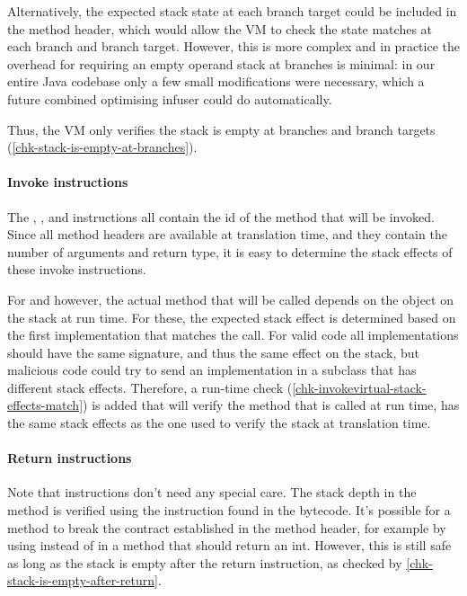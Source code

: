 Alternatively, the expected stack state at each branch target could be included in the method header, which would allow the VM to check the state matches at each branch and branch target. However, this is more complex and in practice the overhead for requiring an empty operand stack at branches is minimal: in our entire Java codebase only a few small modifications were necessary, which a future combined optimising infuser could do automatically.

Thus, the VM only verifies the stack is empty at branches and branch targets (\ref{chk-stack-is-empty-at-branches}).

\paragraph{Invoke instructions}
The , , and  instructions all contain the id of the method that will be invoked. Since all method headers are available at translation time, and they contain the number of arguments and return type, it is easy to determine the stack effects of these invoke instructions.
 
For  and  however, the actual method that will be called depends on the object on the stack at run time. For these, the expected stack effect is determined based on the first implementation that matches the call. For valid code all implementations should have the same signature, and thus the same effect on the stack, but malicious code could try to send an implementation in a subclass that has different stack effects. Therefore, a run-time check (\ref{chk-invokevirtual-stack-effects-match}) is added that will verify the method that is called at run time, has the same stack effects as the one used to verify the stack at translation time.

\paragraph{Return instructions}
Note that  instructions don't need any special care. The stack depth in the method is verified using the instruction found in the bytecode. It's possible for a method to break the contract established in the method header, for example by using  instead of  in a method that should return an int. However, this is still safe as long as the stack is empty after the return instruction, as checked by \ref{chk-stack-is-empty-after-return}.

